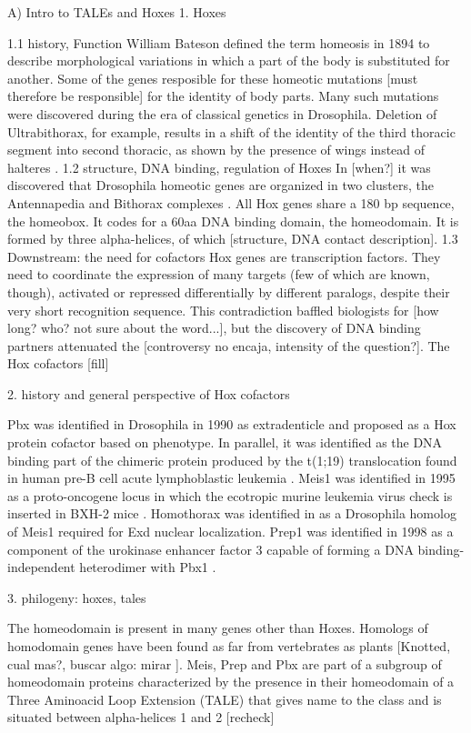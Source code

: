 
A) Intro to TALEs and Hoxes
	1. Hoxes

		1.1 history, Function
		William Bateson defined the term homeosis in 1894 to describe morphological variations in which a part of the body is substituted for another. Some of the genes resposible for these homeotic mutations [must therefore be responsible] for the identity of body parts. Many such mutations were discovered during the era of classical genetics in Drosophila. Deletion of Ultrabithorax, for example, results in a shift of the identity of the third thoracic segment into second thoracic, as shown by the presence of wings instead of halteres \cite{ref}.  
		1.2 structure, DNA binding, regulation of Hoxes
		In [when?] it was discovered that Drosophila homeotic genes are organized in two clusters, the Antennapedia and Bithorax complexes \cite{Lewis1978, Kaufman1990}. 
		All Hox genes share a 180 bp sequence, the homeobox. It codes for a 60aa DNA binding domain, the homeodomain. It is formed by three alpha-helices, of which [structure, DNA contact description].
		1.3 Downstream: the need for cofactors
		Hox genes are transcription factors. They need to coordinate the expression of many targets (few of which are known, though), activated or repressed differentially by different paralogs, despite their very short recognition sequence. This contradiction baffled biologists for [how long? who? not sure about the word...], but the discovery of DNA binding partners attenuated the [controversy no encaja, intensity of the question?]. The Hox cofactors [fill]


	2. history and general perspective of Hox cofactors

	Pbx was identified in Drosophila in 1990 as extradenticle \cite{Peifer1990} and proposed as a Hox protein cofactor based on phenotype. In parallel, it was identified as the DNA binding part of the chimeric protein produced by the t(1;19) translocation found in human pre-B cell acute lymphoblastic leukemia \cite{Kamps1990}. 
	Meis1 was identified in 1995 as a proto-oncogene locus in which the ecotropic murine leukemia virus {check} is inserted in BXH-2 mice \cite{Moskow1995}. Homothorax was identified in \cite{Rauskolb1995,Rieckhof1997} as a Drosophila homolog of Meis1 required for Exd nuclear localization. 
	Prep1 was identified in 1998 as a component of the urokinase enhancer factor 3 capable of forming a DNA binding-independent heterodimer with Pbx1 \cite{Berthelsen1998}.

	3. philogeny: hoxes, tales

		The homeodomain is present in many genes other than Hoxes. Homologs of homodomain genes have been found as far from vertebrates as plants [Knotted, cual mas?, buscar algo: mirar \cite{Burglin1997}]. Meis, Prep and Pbx are part of a subgroup of homeodomain proteins characterized by the presence in their homeodomain of a Three Aminoacid Loop Extension (TALE) that gives name to the class and is situated between alpha-helices 1 and 2 [recheck] \cite{Burglin1994, Mukherjee2007, Moens2006}

